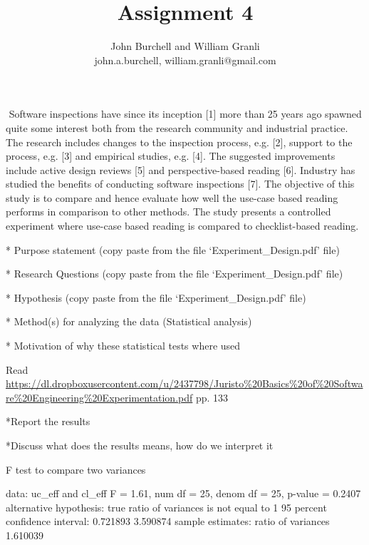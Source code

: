 \documentclass[10pt,twocolumn]{article}
\begin{document}
\title{Assignment 4}

\author{John Burchell and William Granli \\
john.a.burchell, william.granli@gmail.com}


\maketitle
\thispagestyle{empty}




​
Software inspections have since its inception [1] more than
25 years ago spawned quite some interest both from the
research community and industrial practice. The research
includes changes to the inspection process, e.g. [2], support to
the process, e.g. [3] and empirical studies, e.g. [4]. The
suggested improvements include active design reviews [5] and
perspective-based reading [6]. Industry has studied the
benefits of conducting software inspections [7].
The objective of this study is to compare and hence
evaluate how well the use-case based reading performs in
comparison to other methods. The study presents a controlled
experiment where use-case based reading is compared to
checklist-based reading.


* Purpose statement (copy paste from the file ‘Experiment\_Design.pdf’ file)

* Research Questions (copy paste from the file ‘Experiment\_Design.pdf’ file)

* Hypothesis (copy paste from the file ‘Experiment\_Design.pdf’ file)

* Method(s) for analyzing the data (Statistical analysis)

* Motivation of why these statistical tests where used

Read \url{https://dl.dropboxusercontent.com/u/2437798/Juristo%20Basics%20of%20Software%20Engineering%20Experimentation.pdf} pp. 133

*Report the results

*Discuss what does the results means, how do we interpret it


	F test to compare two variances

data:  uc_eff and cl_eff
F = 1.61, num df = 25, denom df = 25, p-value = 0.2407
alternative hypothesis: true ratio of variances is not equal to 1
95 percent confidence interval:
 0.721893 3.590874
sample estimates:
ratio of variances 
          1.610039 
\end{document}

